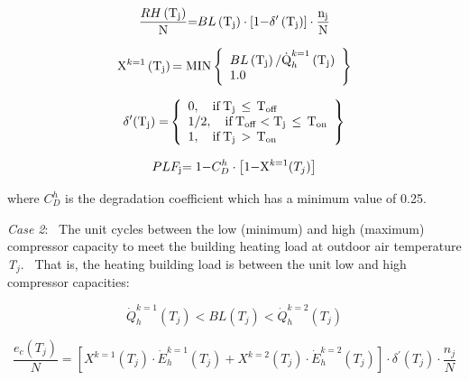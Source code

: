 \begin{equation}
\frac{{RH\left( {{{\rm{T}}_{\rm{j}}}} \right)}}{{\rm{N}}}{\rm{ = }}BL\left( {{{\rm{T}}_{\rm{j}}}} \right) \cdot \left[ {{\rm{1 - }}{{\rm{\delta }}^\prime}\left( {{{\rm{T}}_{\rm{j}}}} \right)} \right] \cdot \frac{{{{\rm{n}}_{\rm{j}}}}}{{\rm{N}}}
\end{equation}

\begin{equation}
{{\rm{X}}^{k = 1}}\left( {{{\rm{T}}_{\rm{j}}}} \right){\rm{ = MIN}}\left\{ \begin{array}{l}BL\left( {{{\rm{T}}_{\rm{j}}}} \right){\rm{/\dot Q}}_h^{k = 1}\left( {{{\rm{T}}_{\rm{j}}}} \right)\\1.0\end{array} \right\}
\end{equation}

\begin{equation}
{\delta ^\prime}{\rm{(}}{{\rm{T}}_{\rm{j}}}{\rm{) = }}\left\{ \begin{array}{l}0,\quad {\rm{if}}\,{{\rm{T}}_{\rm{j}}}\, \le \,{{\rm{T}}_{{\rm{off}}}}\,\\1/2,\quad {\rm{if}}\,{{\rm{T}}_{{\rm{off}}}} < {{\rm{T}}_{\rm{j}}}\, \le \,{{\rm{T}}_{{\rm{on}}}}\\1,\quad {\rm{if}}\,{{\rm{T}}_{\rm{j}}}\, > \,{{\rm{T}}_{{\rm{on}}}}\end{array} \right\}
\end{equation}

\begin{equation}
PL{F_{\rm{j}}}{\rm{ = 1 - }}C_D^h \cdot \left[ {{\rm{1 - }}{{\rm{X}}^{k = 1}}{\rm{(}}{T_j}{\rm{)}}} \right]
\end{equation}

where \(C_D^h\) is the degradation coefficient which has a minimum value of 0.25.

\emph{Case 2}:~ The unit cycles between the low (minimum) and high (maximum) compressor capacity to meet the building heating load at outdoor air temperature \emph{T\(_{j}\)}.~ That is, the heating building load is between the unit low and high compressor capacities:

\begin{equation}
\dot Q_h^{k = 1}({T_j}) < BL({T_j}) < \dot Q_h^{k = 2}({T_j})
\end{equation}

\begin{equation}
\frac{{{e_c}({T_j})}}{N} = \left[ {{X^{k = 1}}({T_j}) \cdot \dot E_h^{k = 1}({T_j}) + {X^{k = 2}}({T_j}) \cdot \dot E_h^{k = 2}({T_j})} \right] \cdot {\delta ^\prime}({T_j}) \cdot \frac{{{n_j}}}{N}
\end{equation}

